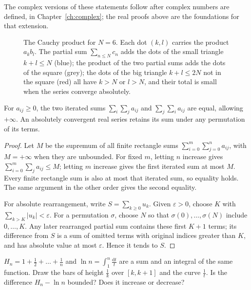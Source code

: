 The complex versions of these statements follow after complex numbers are
defined, in Chapter~\ref{ch:complex}; the real proofs above are the foundations
for that extension.

\begin{figure}[ht]
\centering
{}
\caption{The Cauchy product for $N=6$. Each dot $(k,l)$ carries the product $a_kb_l$. The partial sum $\sum_{n\le N}c_n$ adds the dots of the small triangle $k+l\le N$ (blue); the product of the two partial sums adds the dots of the square (grey); the dots of the big triangle $k+l\le2N$ not in the square (red) all have $k>N$ or $l>N$, and their total is small when the series converge absolutely.}
\label{fig:cauchyprod}
\end{figure}

\begin{proposition}\label{prop:safe-sums}
For $a_{ij}\ge0$, the two iterated sums $\sum_i\sum_j a_{ij}$ and
$\sum_j\sum_i a_{ij}$ are equal, allowing $+\infty$.
An absolutely convergent real series retains its sum under any permutation
of its terms.
\end{proposition}
\begin{proof}
Let $M$ be the supremum of all finite rectangle sums
$\sum_{i=0}^m\sum_{j=0}^n a_{ij}$, with $M=+\infty$ when they are unbounded.
For fixed $m$, letting $n$ increase gives $\sum_{i=0}^m\sum_j a_{ij}\le M$;
letting $m$ increase gives the first iterated sum at most $M$.
Every finite rectangle sum is also at most that iterated sum, so equality holds.
The same argument in the other order gives the second equality.

For absolute rearrangement, write $S=\sum_{k\ge0}u_k$. Given $\varepsilon>0$,
choose $K$ with $\sum_{k>K}|u_k|<\varepsilon$. For a permutation $\sigma$,
choose $N$ so that $\sigma(0),\dots,\sigma(N)$ include $0,\dots,K$.
Any later rearranged partial sum contains these first $K+1$ terms; its difference
from $S$ is a sum of omitted terms with original indices greater than $K$,
and has absolute value at most $\varepsilon$. Hence it tends to $S$.
\end{proof}

\begin{think}
$H_n=1+\frac12+\dots+\frac1n$ and $\ln n=\int_1^n\frac{\mathrm dt}t$ are a sum and an integral of the same function. Draw the bars of height $\frac1k$ over $[k,k+1]$ and the curve $\frac1t$. Is the difference $H_n-\ln n$ bounded? Does it increase or decrease?
\end{think}

